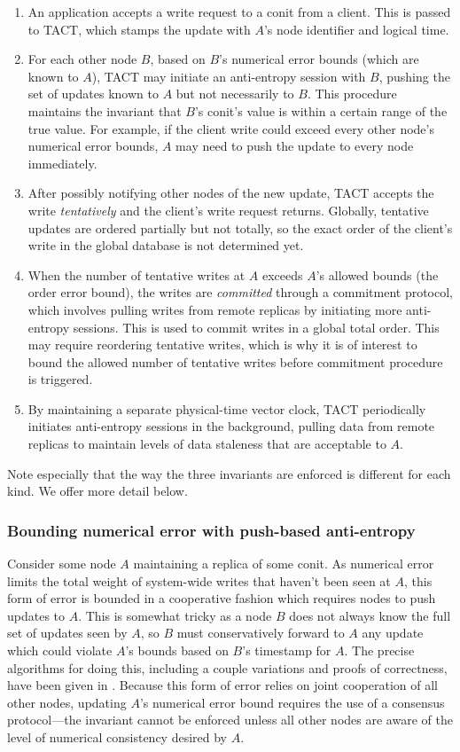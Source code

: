 \begin{enumerate}
   \item An application accepts a write request to a conit from a client. This is passed to TACT, which stamps the update with $A$'s node identifier and logical time.
   \item For each other node $B$, based on $B$'s numerical error bounds (which are known to $A$), TACT may initiate an anti-entropy session with $B$, pushing the set of updates known to $A$ but not necessarily to $B$. This procedure maintains the invariant that $B$'s conit's value is within a certain range of the true value. For example, if the client write could exceed every other node's numerical error bounds, $A$ may need to push the update to every node immediately.
   \item After possibly notifying other nodes of the new update, TACT accepts the write \emph{tentatively} and the client's write request returns. Globally, tentative updates are ordered partially but not totally, so the exact order of the client's write in the global database is not determined yet.
   \item When the number of tentative writes at $A$ exceeds $A$'s allowed bounds (the order error bound), the writes are \emph{committed} through a commitment protocol, which involves pulling writes from remote replicas by initiating more anti-entropy sessions. This is used to commit writes in a global total order. This may require reordering tentative writes, which is why it is of interest to bound the allowed number of tentative writes before commitment procedure is triggered.
   \item By maintaining a separate physical-time vector clock, TACT periodically initiates anti-entropy sessions in the background, pulling data from remote replicas to maintain levels of data staleness that are acceptable to $A$.
\end{enumerate}

Note especially that the way the three invariants are enforced is different for each kind. We offer more detail below.


\subsubsection{Bounding numerical error with push-based anti-entropy}

Consider some node $A$ maintaining a replica of some conit. As numerical error limits the total weight of system-wide writes that haven't been seen at $A$, this form of error is bounded in a cooperative fashion which requires nodes to push updates to $A$. This is somewhat tricky as a node $B$ does not always know the full set of updates seen by $A$, so $B$ must conservatively forward to $A$ any update which could violate $A$'s bounds based on $B$'s timestamp for $A$. The precise algorithms for doing this, including a couple variations and proofs of correctness, have been given in \cite{2000tactalgorithms}. Because this form of error relies on joint cooperation of all other nodes, updating $A$'s numerical error bound requires the use of a consensus protocol---the invariant cannot be enforced unless all other nodes are aware of the level of numerical consistency desired by $A$.

